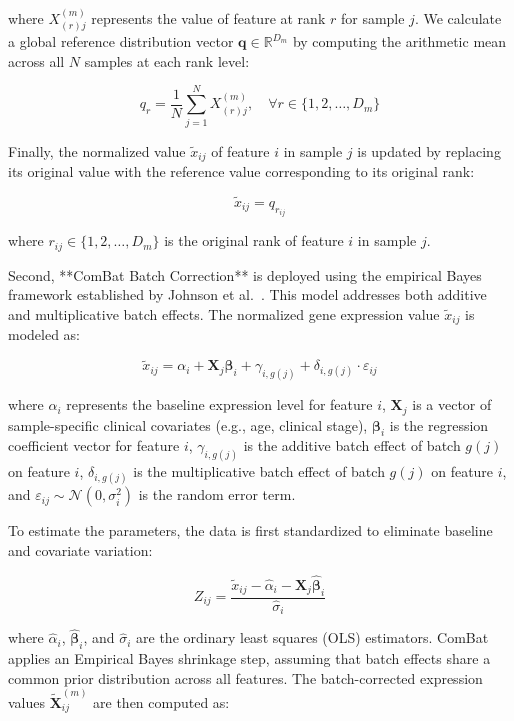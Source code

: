 \documentclass[12pt,a4paper,onecolumn]{article}
\begin{document}
where $X^{(m)}_{(r)j}$ represents the value of feature at rank $r$ for sample $j$. We calculate a global reference distribution vector $\mathbf{q} \in \mathbb{R}^{D_m}$ by computing the arithmetic mean across all $N$ samples at each rank level:

\begin{equation}
q_r = \frac{1}{N} \sum_{j=1}^N X^{(m)}_{(r)j}, \quad \forall r \in \{1, 2, \dots, D_m\}
\end{equation}

Finally, the normalized value $\tilde{x}_{ij}$ of feature $i$ in sample $j$ is updated by replacing its original value with the reference value corresponding to its original rank:

\begin{equation}
\tilde{x}_{ij} = q_{r_{ij}}
\end{equation}

where $r_{ij} \in \{1, 2, \dots, D_m\}$ is the original rank of feature $i$ in sample $j$.

Second, **ComBat Batch Correction** is deployed using the empirical Bayes framework established by Johnson et al.~\cite{johnson2007}. This model addresses both additive and multiplicative batch effects. The normalized gene expression value $\tilde{x}_{ij}$ is modeled as:

\begin{equation}
\tilde{x}_{ij} = \alpha_i + \mathbf{X}_j \boldsymbol{\beta}_i + \gamma_{i, g(j)} + \delta_{i, g(j)} \cdot \varepsilon_{ij}
\end{equation}

where $\alpha_i$ represents the baseline expression level for feature $i$, $\mathbf{X}_j$ is a vector of sample-specific clinical covariates (e.g., age, clinical stage), $\boldsymbol{\beta}_i$ is the regression coefficient vector for feature $i$, $\gamma_{i, g(j)}$ is the additive batch effect of batch $g(j)$ on feature $i$, $\delta_{i, g(j)}$ is the multiplicative batch effect of batch $g(j)$ on feature $i$, and $\varepsilon_{ij} \sim \mathcal{N}(0, \sigma_i^2)$ is the random error term.

To estimate the parameters, the data is first standardized to eliminate baseline and covariate variation:

\begin{equation}
Z_{ij} = \frac{\tilde{x}_{ij} - \hat{\alpha}_i - \mathbf{X}_j \hat{\boldsymbol{\beta}}_i}{\hat{\sigma}_i}
\end{equation}

where $\hat{\alpha}_i$, $\hat{\boldsymbol{\beta}}_i$, and $\hat{\sigma}_i$ are the ordinary least squares (OLS) estimators. ComBat applies an Empirical Bayes shrinkage step, assuming that batch effects share a common prior distribution across all features. The batch-corrected expression values $\tilde{\mathbf{X}}^{(m)}_{ij}$ are then computed as:
\end{document}
